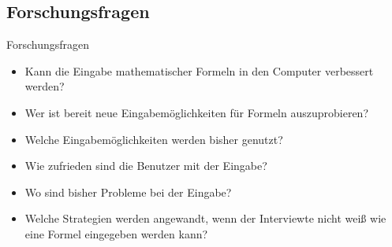 
\subsection{Forschungsfragen}

\begin{frame}{Forschungsfragen}
\begin{itemize}[<+->]
    \item Kann die Eingabe mathematischer Formeln in den Computer
          verbessert werden?
    \item Wer ist bereit neue Eingabemöglichkeiten für Formeln auszuprobieren?
    \item Welche Eingabemöglichkeiten werden bisher genutzt?
    \item Wie zufrieden sind die Benutzer mit der Eingabe?
    \item Wo sind bisher Probleme bei der Eingabe?
    \item Welche Strategien werden angewandt, wenn der Interviewte nicht weiß
          wie eine Formel eingegeben werden kann?
\end{itemize}
\end{frame}